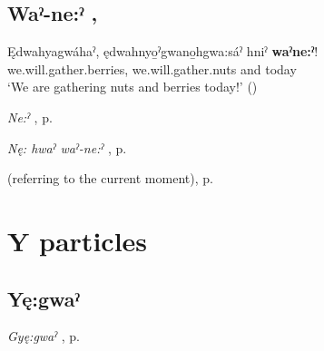 \subsection*{\textbf{Waˀ-ne:ˀ} , } \label{p:[waˀ-ne:ˀ]}

\ea
\label{ex:wpart19}
\gll Ędwahyagwáhaˀ, ędwahnyo̱ˀgwano̱hgwa:sáˀ hniˀ \textbf{waˀne:ˀ}!\\
we.will.gather.berries, we.will.gather.nuts and today\\
\glt ‘We are gathering nuts and berries today!’ (\cite{carrier_legends_2013})
\z


\begin{CayugaRelated}
\item \textit{Ne:ˀ} , p. \pageref{p:[ne:ˀ] `it is’}\\
\item \textit{Nę: hwaˀ waˀ-ne:ˀ} , p. \pageref{p:[nę: hwaˀ waˀ-ne:ˀ]}\\
\item {} (referring to the current moment), p. \pageref{p:[waˀ-]}
\end{CayugaRelated}



\section{Y particles}

\subsection*{\textbf{Yę:gwaˀ} } \label{p:[yę:gwaˀ]}

\begin{CayugaRelated}
\item \textit{Gyę:gwaˀ} , p. \pageref{p:[gyę:gwaˀ]}
\end{CayugaRelated}

